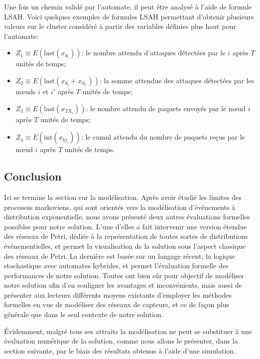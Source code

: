 Une fois un chemin validé par l'automate, il peut être analysé à l'aide de formule LSAH.
Voici quelques exemples de formules LSAH permettant d'obtenir plusieurs valeurs sur le cluster considéré à partir des variables définies plus haut pour l'automate:
\begin{itemize}
    \item $Z_1\equiv E(\mbox{last}(x_{d_i}))$: le nombre attendu d'attaques détectées par le \cn $i$ après $T$ unités de temps;
    \item $Z_2\equiv E(\mbox{last}(x_{d_i}+x_{d_{i'}}))$: la somme attendue des attaques détectées par les nœuds $i$ et $i'$ après $T$ unités de temps;
    \item $Z_3\equiv E(\mbox{last}(x_{\mathit{TX}_i}))$: le nombre attendu de paquets envoyés par le nœud $i$ après $T$ unités de temps;
    \item $Z_4\equiv E(\mbox{int}(x_{\mathit{bf}_i}))$: le cumul attendu du nombre de paquets reçus par le nœud $i$ après $T$ unités de temps.
\end{itemize}

    \subsection{Conclusion}

Ici se termine la section sur la modélisation.
Après avoir étudié les limites des processus markoviens, qui sont orientés vers la modélisation d'événements à distribution exponentielle, nous avons présenté deux autres évaluations formelles possibles pour notre solution.
L'une d'elles a fait intervenir une version étendue des réseaux de Petri, dédiée à la représentation de toutes sortes de distributions événementielles, et permet la visualisation de la solution sous l'aspect classique des réseaux de Petri.
La dernière est basée sur un langage récent, la logique stochastique avec automates hybrides, et permet l'évaluation formelle des performances de notre solution.
Toutes ont bien sûr pour objectif de modéliser notre solution afin d'en souligner les avantages et inconvénients, mais aussi de présenter aux lecteurs différents moyens existants d'employer les méthodes formelles en vue de modéliser des réseaux de capteurs, et ce de façon plus générale que dans le seul contexte de notre solution.

Évidemment, malgré tous ses attraits la modélisation ne peut se substituer à une évaluation numérique de la solution, comme nous allons le présenter, dans la section suivante, par le biais des résultats obtenus à l'aide d'une simulation.
